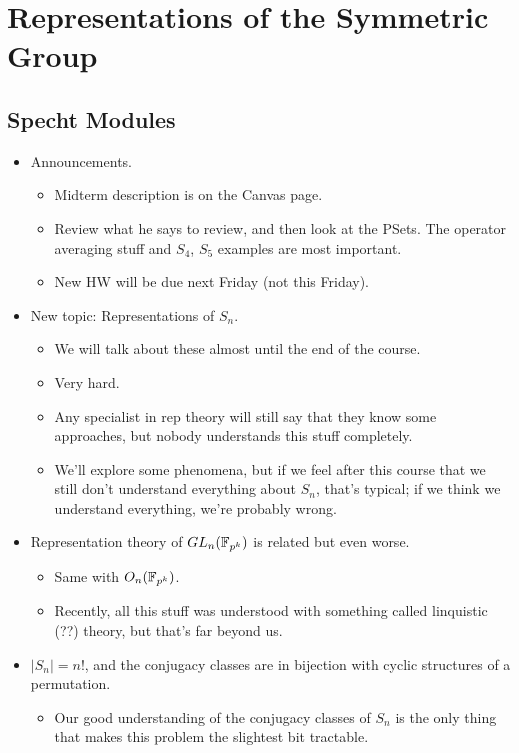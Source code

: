\documentclass[../notes.tex]{subfiles}
\begin{document}
\chapter{Representations of the Symmetric Group}
\section{Specht Modules}
\begin{itemize}
    \item {}Announcements.
    \begin{itemize}
        \item Midterm description is on the Canvas page.
        \item Review what he says to review, and then look at the PSets. The operator averaging stuff and $S_4$, $S_5$ examples are most important.
        \item New HW will be due next Friday (not this Friday).
    \end{itemize}
    \item New topic: Representations of $S_n$.
    \begin{itemize}
        \item We will talk about these almost until the end of the course.
        \item Very hard.
        \item Any specialist in rep theory will still say that they know some approaches, but nobody understands this stuff completely.
        \item We'll explore some phenomena, but if we feel after this course that we still don't understand everything about $S_n$, that's typical; if we think we understand everything, we're probably wrong.
    \end{itemize}
    \item Representation theory of $GL_n(\mathbb{F}_{p^k})$ is related but even worse.
    \begin{itemize}
        \item Same with $O_n(\mathbb{F}_{p^k})$.
        \item Recently, all this stuff was understood with something called linquistic (??) theory, but that's far beyond us.
    \end{itemize}
    \item $|S_n|=n!$, and the conjugacy classes are in bijection with cyclic structures of a permutation.
    \begin{itemize}
        \item Our good understanding of the conjugacy classes of $S_n$ is the only thing that makes this problem the slightest bit tractable.

\end{itemize}
\end{itemize}
\end{document}
